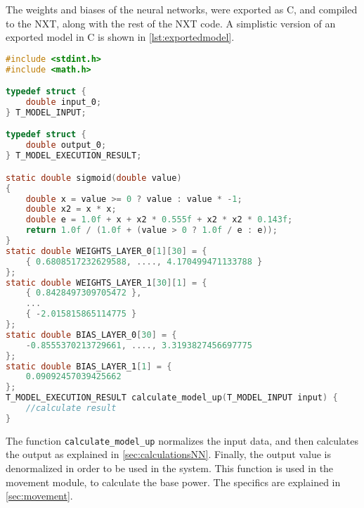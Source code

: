 
The weights and biases of the neural networks, were exported as C, and compiled to the NXT, along with the rest of the NXT code.
A simplistic version of an exported model in C is shown in \autoref{lst:exportedmodel}.


\begin{lstlisting}[language=C,label={lst:exportedmodel},firstnumber={1},caption={Autogenerated model for getting power to move up}]
#include <stdint.h>
#include <math.h>

typedef struct {
	double input_0;
} T_MODEL_INPUT;

typedef struct {
	double output_0;
} T_MODEL_EXECUTION_RESULT;

static double sigmoid(double value)
{
	double x = value >= 0 ? value : value * -1;
	double x2 = x * x;
	double e = 1.0f + x + x2 * 0.555f + x2 * x2 * 0.143f;
	return 1.0f / (1.0f + (value > 0 ? 1.0f / e : e));
}
static double WEIGHTS_LAYER_0[1][30] = {
	{ 0.6808517232629588, ...., 4.170499471133788 }
};
static double WEIGHTS_LAYER_1[30][1] = {
	{ 0.8428497309705472 },
	...
	{ -2.015815865114775 }
};
static double BIAS_LAYER_0[30] = {
	-0.8555370213729661, ...., 3.3193827456697775
};
static double BIAS_LAYER_1[1] = {
	0.09092457039425662
};
T_MODEL_EXECUTION_RESULT calculate_model_up(T_MODEL_INPUT input) {
	//calculate result
}

\end{lstlisting}
The function \texttt{calculate\_model\_up} normalizes the input data, and then calculates the output as explained in \autoref{sec:calculationsNN}.
Finally, the output value is denormalized in order to be used in the system.
This function is used in the movement module, to calculate the base power.
The specifics are explained in \autoref{sec:movement}.


